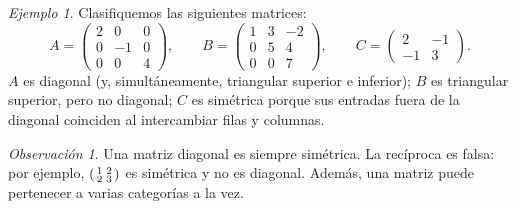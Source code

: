 \documentclass[12pt]{article}
\theoremstyle{remark}
\newtheorem{observacion}[definicion]{Observación}
\newtheorem{ejemplo}[definicion]{Ejemplo}
\begin{document}
\begin{ejemplo}
Clasifiquemos las siguientes matrices:
\[
A=\begin{pmatrix}2&0&0\\0&-1&0\\0&0&4\end{pmatrix},\qquad
B=\begin{pmatrix}1&3&-2\\0&5&4\\0&0&7\end{pmatrix},\qquad
C=\begin{pmatrix}2&-1\\-1&3\end{pmatrix}.
\]
$A$ es diagonal (y, simultáneamente, triangular superior e inferior); $B$ es triangular superior, pero no diagonal; $C$ es simétrica porque sus entradas fuera de la diagonal coinciden al intercambiar filas y columnas.
\end{ejemplo}

\begin{observacion}
Una matriz diagonal es siempre simétrica. La recíproca es falsa: por ejemplo, $\begin{psmallmatrix}1&2\\2&3\end{psmallmatrix}$ es simétrica y no es diagonal. Además, una matriz puede pertenecer a varias categorías a la vez.
\end{observacion}

\end{document}
